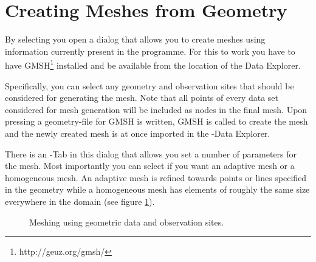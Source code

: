 \section{Creating Meshes from Geometry}

By selecting  you open a dialog that allows you to create meshes using information currently present in the programme. For this to work you have to have GMSH\footnote{http://geuz.org/gmsh/} installed and be available from the location of the Data Explorer.

Specifically, you can select any geometry and observation sites that should be considered for generating the mesh. Note that all points of every data set considered for mesh generation will be included as nodes in the final mesh. Upon pressing  a geometry-file for GMSH is written, GMSH is called to create the mesh and the newly created mesh is at once imported in the \ogs-Data Explorer.

There is an -Tab in this dialog that allows you set a number of parameters for the mesh. Most importantly you can select if you want an adaptive mesh or a homogeneous mesh. An adaptive mesh is refined towards points or lines specified in the geometry while a homogeneous mesh has elements of roughly the same size everywhere in the domain (see figure \ref{fig:meshing}).

\begin{figure}[tb]
\begin{center}
\enspace
{}\enspace
{}
\end{center}
\caption{Meshing using geometric data and observation sites.} \label{fig:meshing}
\end{figure}


